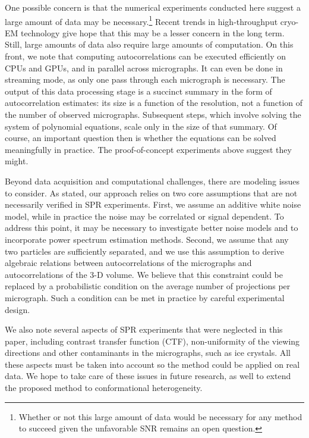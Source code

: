 \documentclass[9pt,twocolumn,twoside,lineno]{pnas-new}
\begin{document}
One possible concern is that the numerical experiments conducted here suggest a large amount of data may be necessary.\footnote{Whether or not this large amount of data would be necessary for any method to succeed given the unfavorable SNR remains an open question.} Recent trends in high-throughput cryo-EM technology  give hope that this may be a lesser concern in the long term. Still, large amounts of data also require large amounts of computation. On this front, we note that computing autocorrelations can be executed efficiently on CPUs and GPUs, and in parallel across micrographs. It can even be done in streaming mode, as only one pass through each micrograph is necessary. The output of this data processing stage is a succinct summary in the form of autocorrelation estimates: its size is a function of the resolution, not a function of the number of observed micrographs. Subsequent steps, which involve solving the system of polynomial equations, scale only in the size of that summary. Of course, an important question then is whether the equations can be solved meaningfully in practice. The proof-of-concept experiments above suggest they might. 

Beyond data acquisition and computational challenges, there are modeling issues to consider.
As stated, our approach relies on two core assumptions that are not necessarily verified in SPR experiments.
First, we assume an additive white noise model, while in practice the noise may be correlated or signal dependent. To address this point, it may be necessary to investigate better noise models and to incorporate power spectrum estimation methods. %
Second, we assume that any two particles are sufficiently separated, and we use this assumption to derive algebraic relations between autocorrelations of the micrographs and autocorrelations of the 3-D volume. 
We believe that this constraint could be replaced by a probabilistic condition on the average number of projections per micrograph. 
Such a condition can be met in practice by careful experimental design.

We also note several aspects of SPR experiments that were neglected in this paper, including contrast transfer function (CTF), non-uniformity of the viewing directions  and other contaminants in the micrographs, such as ice crystals.
 All these aspects must be taken into account so the method could be applied on real data. We hope to take care of these issues in future research, as well to extend the proposed method to conformational heterogeneity. 
\end{document}
